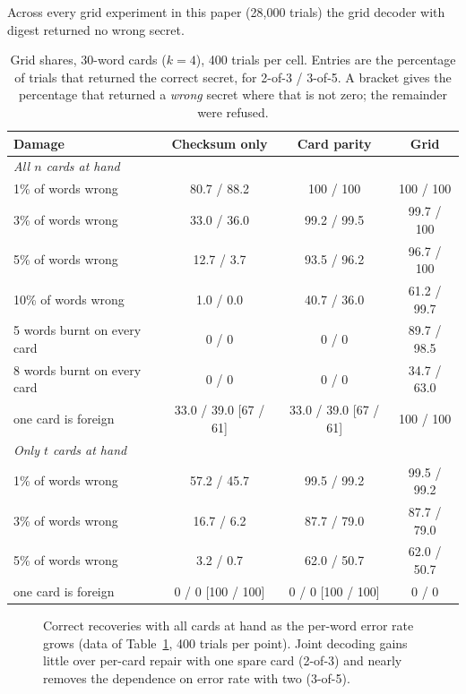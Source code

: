 \documentclass[numeric]{anvil-paper}
\begin{document}
Across every grid experiment in this paper (28{,}000 trials) the grid decoder
with digest returned no wrong secret.

\begin{table}[tb]
\centering
\caption{Grid shares, 30-word cards ($k=4$), 400 trials per cell. Entries are
the percentage of trials that returned the correct secret, for 2-of-3 / 3-of-5.
A bracket gives the percentage that returned a \emph{wrong} secret where that
is not zero; the remainder were refused.}
\label{tab:grid}
\small
\begin{tabular}{lccc}
\toprule
Damage & Checksum only & Card parity & Grid \\
\midrule
\multicolumn{4}{l}{\emph{All $n$ cards at hand}}\\
1\% of words wrong & 80.7 / 88.2 & 100 / 100 & 100 / 100 \\
3\% of words wrong & 33.0 / 36.0 & 99.2 / 99.5 & 99.7 / 100 \\
5\% of words wrong & 12.7 / 3.7 & 93.5 / 96.2 & 96.7 / 100 \\
10\% of words wrong & 1.0 / 0.0 & 40.7 / 36.0 & 61.2 / 99.7 \\
5 words burnt on every card & 0 / 0 & 0 / 0 & 89.7 / 98.5 \\
8 words burnt on every card & 0 / 0 & 0 / 0 & 34.7 / 63.0 \\
one card is foreign & 33.0 / 39.0 [67 / 61] & 33.0 / 39.0 [67 / 61] & 100 / 100 \\
\midrule
\multicolumn{4}{l}{\emph{Only $t$ cards at hand}}\\
1\% of words wrong & 57.2 / 45.7 & 99.5 / 99.2 & 99.5 / 99.2 \\
3\% of words wrong & 16.7 / 6.2 & 87.7 / 79.0 & 87.7 / 79.0 \\
5\% of words wrong & 3.2 / 0.7 & 62.0 / 50.7 & 62.0 / 50.7 \\
one card is foreign & 0 / 0 [100 / 100] & 0 / 0 [100 / 100] & 0 / 0 \\
\bottomrule
\end{tabular}
\end{table}

\begin{figure}[tb]
\centering

\caption{Correct recoveries with all cards at hand as the per-word error rate
grows (data of Table~\ref{tab:grid}, 400 trials per point). Joint decoding
gains little over per-card repair with one spare card (2-of-3) and nearly
removes the dependence on error rate with two (3-of-5).}
\label{fig:rates}
\end{figure}
\end{document}
